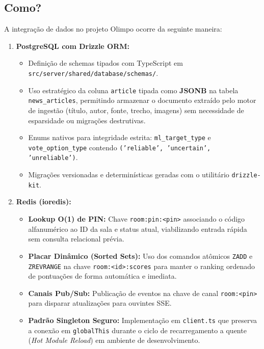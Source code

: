 \documentclass[12pt,a4paper]{article}
\begin{document}
\subsection{Como?}
A integração de dados no projeto Olimpo ocorre da seguinte maneira:
\begin{enumerate}
  \item \textbf{PostgreSQL com Drizzle ORM:}
  \begin{itemize}
    \item Definição de schemas tipados com TypeScript em \texttt{src/server/shared/database/schemas/}.
    \item Uso estratégico da coluna \texttt{article} tipada como \textbf{JSONB} na tabela \texttt{news\_articles}, permitindo armazenar o documento extraído pelo motor de ingestão (título, autor, fonte, trecho, imagens) sem necessidade de esparsidade ou migrações destrutivas.
    \item Enums nativos para integridade estrita: \texttt{ml\_target\_type} e \texttt{vote\_option\_type} contendo \texttt{('reliable', 'uncertain', 'unreliable')}.
    \item Migrações versionadas e determinísticas geradas com o utilitário \texttt{drizzle-kit}.
  \end{itemize}
  \item \textbf{Redis (ioredis):}
  \begin{itemize}
    \item \textbf{Lookup O(1) de PIN:} Chave \texttt{room:pin:<pin>} associando o código alfanumérico ao ID da sala e status atual, viabilizando entrada rápida sem consulta relacional prévia.
    \item \textbf{Placar Dinâmico (Sorted Sets):} Uso dos comandos atômicos \texttt{ZADD} e \texttt{ZREVRANGE} na chave \texttt{room:<id>:scores} para manter o ranking ordenado de pontuações de forma automática e imediata.
    \item \textbf{Canais Pub/Sub:} Publicação de eventos na chave de canal \texttt{room:<pin>} para disparar atualizações para ouvintes SSE.
    \item \textbf{Padrão Singleton Seguro:} Implementação em \texttt{client.ts} que preserva a conexão em \texttt{globalThis} durante o ciclo de recarregamento a quente (\textit{Hot Module Reload}) em ambiente de desenvolvimento.
  \end{itemize}
\end{enumerate}

\end{document}
